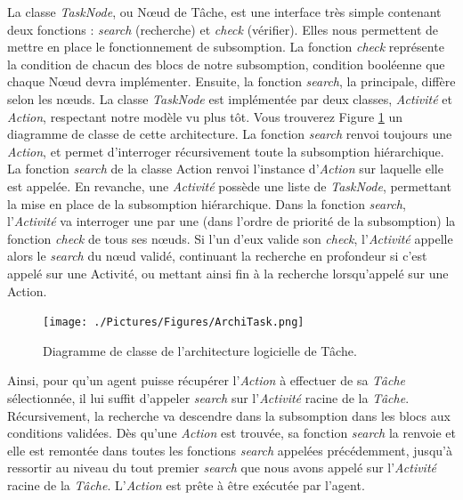 			La classe \textit{TaskNode}, ou Nœud de Tâche, est une interface très simple contenant deux fonctions : \textit{search} (recherche) et \textit{check} (vérifier). Elles nous permettent de mettre en place le fonctionnement de subsomption. La fonction \textit{check} représente la condition de chacun des blocs de notre subsomption, condition booléenne que chaque Nœud devra implémenter. Ensuite, la fonction \textit{search}, la principale, diffère selon les nœuds. La classe \textit{TaskNode} est implémentée par deux classes, \textit{Activité} et \textit{Action}, respectant notre modèle vu plus tôt. Vous trouverez Figure \ref{ArchiTask} un diagramme de classe de cette architecture. La fonction \textit{search} renvoi toujours une \textit{Action}, et permet d'interroger récursivement toute la subsomption hiérarchique. La fonction \textit{search} de la classe Action renvoi l'instance d'\textit{Action} sur laquelle elle est appelée. En revanche, une \textit{Activité} possède une liste de \textit{TaskNode}, permettant la mise en place de la subsomption hiérarchique. Dans la fonction \textit{search}, l'\textit{Activité} va interroger une par une (dans l'ordre de priorité de la subsomption) la fonction \textit{check} de tous ses nœuds. Si l'un d'eux valide son \textit{check}, l'\textit{Activité} appelle alors le \textit{search} du nœud validé, continuant la recherche en profondeur si c'est appelé sur une Activité, ou mettant ainsi fin à la recherche lorsqu'appelé sur une Action.
			
			\begin{figure}
			\centering
			\texttt{[image: ./Pictures/Figures/ArchiTask.png]}
			\caption{Diagramme de classe de l'architecture logicielle de Tâche.}
			\label{ArchiTask}
			\end{figure}
			
			Ainsi, pour qu'un agent puisse récupérer l'\textit{Action} à effectuer de sa \textit{Tâche} sélectionnée, il lui suffit d'appeler \textit{search} sur l'\textit{Activité} racine de la \textit{Tâche}. Récursivement, la recherche va descendre dans la subsomption dans les blocs aux conditions validées. Dès qu'une \textit{Action} est trouvée, sa fonction \textit{search} la renvoie et elle est remontée dans toutes les fonctions \textit{search} appelées précédemment, jusqu'à ressortir au niveau du tout premier \textit{search} que nous avons appelé sur l'\textit{Activité} racine de la \textit{Tâche}. L'\textit{Action} est prête à être exécutée par l'agent.
			
			
